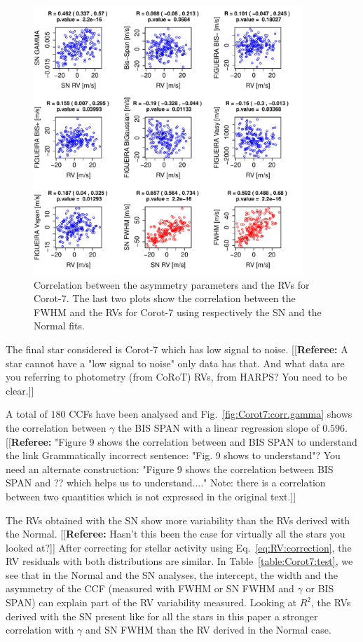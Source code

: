\documentclass[11pt, oneside]{article}
\newcommand{\comment}[1]{{\color{red}[[\textbf{Referee: }#1]]}}
\begin{document}
%
\begin{figure}[htbp]
   \centering
\includegraphics[height = 4in]{LRa01_E_[4]Comparison_para.pdf} 
   \caption{Correlation between the asymmetry parameters and the RVs for Corot-7. The last two plots show the correlation between the FWHM and the RVs for Corot-7 using respectively the SN and the Normal fits.}
   \label{fig:Corot7:corrPlot}
\end{figure}
%

\iffalse
The final star considered is Corot-7 which has low signal to noise. 
\comment{A star cannot have a "low signal to noise" only data has that. And what data are you referring to photometry (from CoRoT) RVs, from HARPS? You need to be clear.}

A total of $180$ CCFs have been analysed and Fig.~\ref{fig:Corot7:corr.gamma} shows the correlation between $\gamma$ the BIS SPAN with a linear regression slope of $0.596$.
\comment{"Figure 9 shows the correlation between and BIS SPAN to understand the link Grammatically incorrect sentence: "Fig. 9 shows to understand"?
You need an alternate construction: "Figure 9 shows the correlation between BIS SPAN and ?? which helps us to understand...."
Note: there is a correlation between two quantities which is not expressed in the original text.}

The RVs obtained with the SN show more variability than the RVs derived with the Normal. 
\comment{Hasn't this been the case for virtually all the stars you looked at?}
After correcting for stellar activity using Eq.~\ref{eq:RV:correction}, the RV residuals with both distributions are similar. In Table~\ref{table:Corot7:test}, we see that in the Normal and the SN analyses, the intercept, the width and the asymmetry of the CCF (measured with FWHM or SN FWHM and $\gamma$ or BIS SPAN) can explain part of the RV variability measured. Looking at $R^2$, the RVs derived with the SN present like for all the stars in this paper a stronger correlation with $\gamma$ and SN FWHM than the RV derived in the Normal case.
\end{document}
